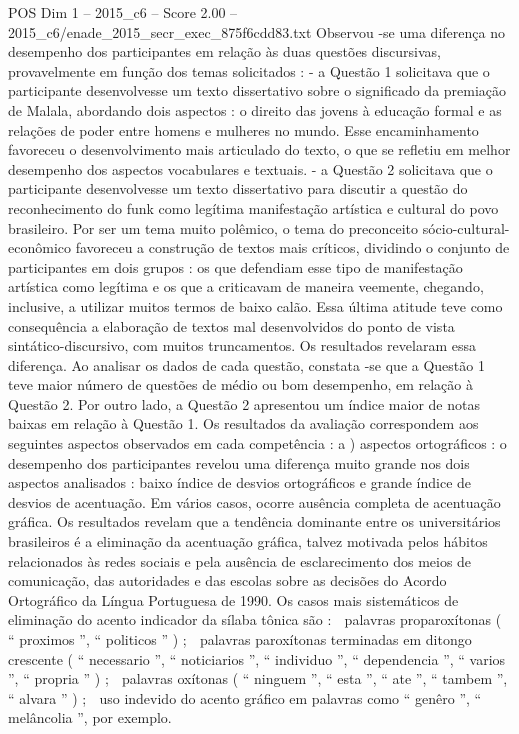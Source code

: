 \begin{textsample}{POS Dim 1 – 2015\_c6 – Score 2.00 – 2015\_c6/enade\_2015\_secr\_exec\_875f6cdd83.txt}
Observou -se uma diferença no desempenho dos participantes em relação às duas questões discursivas, provavelmente em função dos temas solicitados : - a Questão 1 solicitava que o participante desenvolvesse um texto dissertativo sobre o significado da premiação de Malala, abordando dois aspectos : o direito das jovens à educação formal e as relações de poder entre homens e mulheres no mundo.
Esse encaminhamento favoreceu o desenvolvimento mais articulado do texto, o que se refletiu em melhor desempenho dos aspectos vocabulares e textuais. - a Questão 2 solicitava que o participante desenvolvesse um texto dissertativo para discutir a questão do reconhecimento do funk como legítima manifestação artística e cultural do povo brasileiro.
Por ser um tema muito polêmico, o tema do preconceito sócio-cultural-econômico favoreceu a construção de textos mais críticos, dividindo o conjunto de participantes em dois grupos : os que defendiam esse tipo de manifestação artística como legítima e os que a criticavam de maneira veemente, chegando, inclusive, a utilizar muitos termos de baixo calão.
Essa última atitude teve como consequência a elaboração de textos mal desenvolvidos do ponto de vista sintático-discursivo, com muitos truncamentos.
Os resultados revelaram essa diferença.
Ao analisar os dados de cada questão, constata -se que a Questão 1 teve maior número de questões de médio ou bom desempenho, em relação à Questão 2.
Por outro lado, a Questão 2 apresentou um índice maior de notas baixas em relação à Questão 1.
Os resultados da avaliação correspondem aos seguintes aspectos observados em cada competência : a ) aspectos ortográficos : o desempenho dos participantes revelou uma diferença muito grande nos dois aspectos analisados : baixo índice de desvios ortográficos e grande índice de desvios de acentuação.
Em vários casos, ocorre ausência completa de acentuação gráfica.
Os resultados revelam que a tendência dominante entre os universitários brasileiros é a eliminação da acentuação gráfica, talvez motivada pelos hábitos relacionados às redes sociais e pela ausência de esclarecimento dos meios de comunicação, das autoridades e das escolas sobre as decisões do Acordo Ortográfico da Língua Portuguesa de 1990.
Os casos mais sistemáticos de eliminação do acento indicador da sílaba tônica são :  palavras proparoxítonas ( “ proximos ”, “ politicos ” ) ;  palavras paroxítonas terminadas em ditongo crescente ( “ necessario ”, “ noticiarios ”, “ individuo ”, “ dependencia ”, “ varios ”, “ propria ” ) ;  palavras oxítonas ( “ ninguem ”, “ esta ”, “ ate ”, “ tambem ”, “ alvara ” ) ;  uso indevido do acento gráfico em palavras como “ genêro ”, “ melâncolia ”, por exemplo.

\end{textsample}
